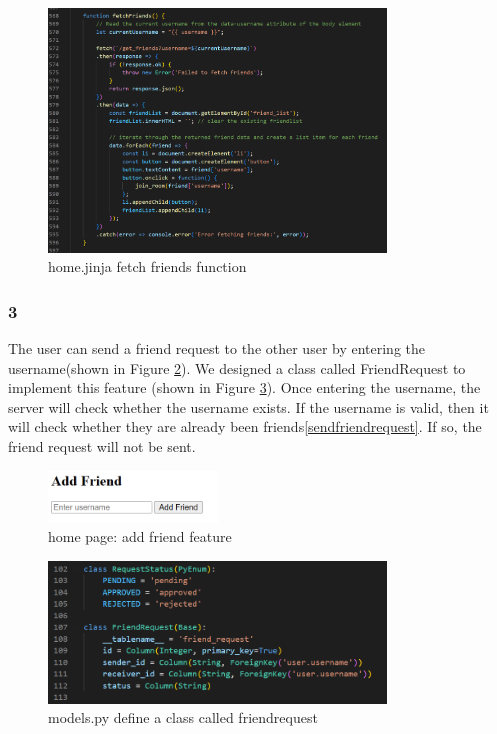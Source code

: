 \documentclass[12pt]{article}
\begin{document}
        \begin{figure}[H]
                \centering
                \includegraphics[width=0.8\textwidth]{zzrgraphs/home_fetchFriends.png}
                \caption{home.jinja fetch friends function}
                \label{fetchfriends}
            \end{figure}

        \subsubsection*{3} The user can send a friend request to the other user by entering the username(shown in Figure \ref{enterusername}). We designed a class called FriendRequest to implement this feature (shown in Figure \ref{friendrequestClass}). Once entering the username, the server will check whether the username exists. If the username is valid, then it will check whether they are already been friends\ref{sendfriendrequest}. If so, the friend request will not be sent.

        \begin{figure}[H]
                \centering
                \includegraphics[width=0.4\textwidth]{zzrgraphs/enter_username.png}
                \caption{home page: add friend feature}
                \label{enterusername}
            \end{figure}

        \begin{figure}[H]
                \centering
                \includegraphics[width=0.8\textwidth]{zzrgraphs/models_friendrequest.png}
                \caption{models.py define a class called friendrequest}
                \label{friendrequestClass}
            \end{figure}
\end{document}
